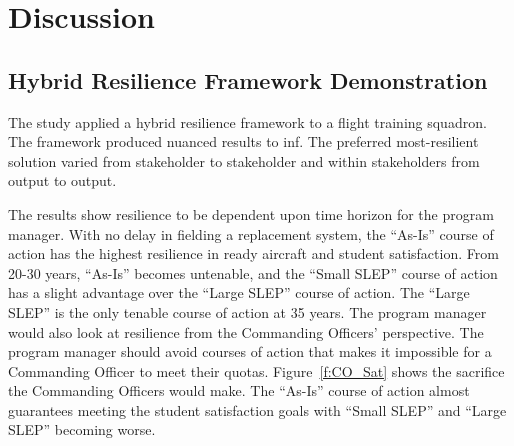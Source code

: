 \documentclass[preprint,12pt]{elsarticle}
\begin{document}
\section{Discussion}
\label{s:Disc}

\subsection{Hybrid Resilience Framework Demonstration}
The study applied a hybrid resilience framework to a flight training
squadron. The framework produced nuanced results to inf. The 
preferred most-resilient solution varied from stakeholder to
stakeholder and within stakeholders from output to output.

The results show resilience to be dependent upon time horizon for the
program manager. With no delay in fielding a replacement system, the
``As-Is'' course of action has the highest resilience in ready
aircraft and student satisfaction. From 20-30 years, ``As-Is'' becomes
untenable, and the ``Small SLEP'' course of action has a slight
advantage over the ``Large SLEP'' course of action. The
``Large SLEP'' is the only tenable course of action at 35 years. The
program manager would also look at resilience from the Commanding
Officers' perspective. The program manager should avoid courses of action that makes it impossible for
a Commanding Officer to meet their quotas. Figure~\ref{f:CO_Sat} shows
the sacrifice the Commanding Officers would make. The ``As-Is'' course
of action almost guarantees meeting the student satisfaction goals
with ``Small SLEP'' and ``Large SLEP'' becoming worse.


\end{document}
